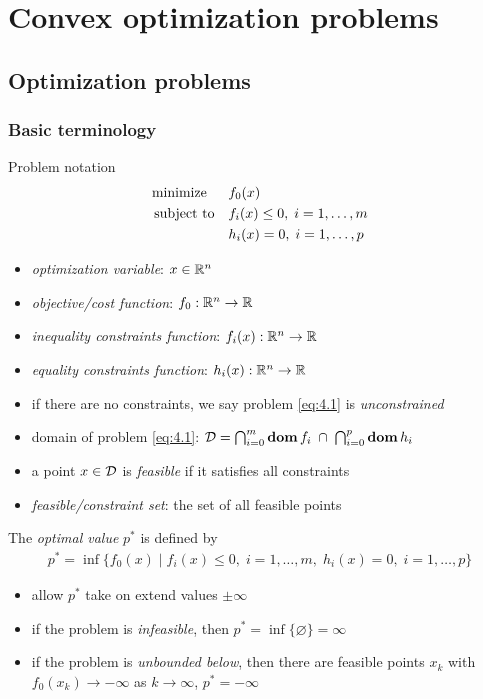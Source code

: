 \chapter{Convex optimization problems}

\section{Optimization problems}

\subsection{Basic terminology}
\label{subsec:4.1.1}
Problem notation
\begin{align}
  \text{minimize\;\;}\quad& f_0(x)\nonumber\\
  \text{subject to}  \quad& f_i(x)\le 0,\;i=1,\dots,m\label{eq:4.1}\\
                          & h_i(x) =  0,\;i=1,\dots,p\nonumber
\end{align}
\begin{itemize}
  \item \textit{optimization variable}: $x\in\mathbb{R}^n$
  \item \textit{objective/cost function}: $f_0:\mathbb{R}^n\rightarrow\mathbb{R}$
  \item \textit{inequality constraints function}: $f_i(x):\mathbb{R}^n\rightarrow\mathbb{R}$
  \item \textit{equality constraints function}: $h_i(x):\mathbb{R}^n\rightarrow\mathbb{R}$
  \item if there are no constraints, we say problem \eqref{eq:4.1} is \textit{unconstrained}
  \item domain of problem \eqref{eq:4.1}: $\mathcal{D}=\bigcap_{i=0}^m\mathop{\bf dom} f_i\;\cap\;\bigcap_{i=0}^p\mathop{\bf dom} h_i$
  \item a point $x\in\mathcal{D}$ is \textit{feasible} if it satisfies all constraints
  \item \textit{feasible/constraint set}: the set of all feasible points
\end{itemize}
The \textit{optimal value} $p^\ast$ is defined by
\begin{align*}
  p^\ast=\inf\{f_0(x)\mid f_i(x)\le 0,\;i=1,\dots,m,\;h_i(x)=0,\;i=1,\dots,p\}
\end{align*}
\begin{itemize}
  \item allow $p^\ast$ take on extend values $\pm\infty$
  \item if the problem is \textit{infeasible}, then $p^\ast=\inf\{\varnothing\}=\infty$
  \item if the problem is \textit{unbounded below}, then there are feasible points $x_k$ with $f_0(x_k)\rightarrow -\infty$ as $k\rightarrow\infty$, $p^\ast=-\infty$
\end{itemize}
